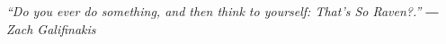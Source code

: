 \chapter*{}
\begin{center}
{\centering \it “Do you ever do something, and then think to yourself: That's So Raven?.”
\newline 
― Zach Galifinakis}
\end{center} 